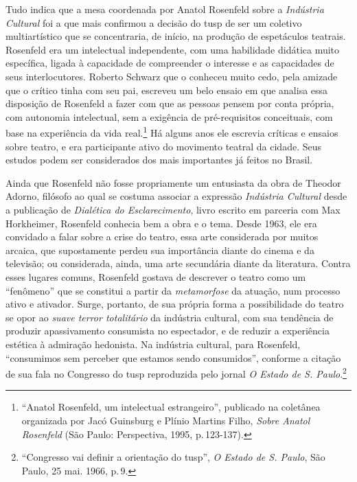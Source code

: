Tudo indica que a mesa coordenada por Anatol Rosenfeld sobre a
{\it Indústria Cultural} foi a que mais confirmou a decisão do {\sc tusp} de
ser um coletivo multiartístico que se concentraria, de início, na
produção de espetáculos teatrais. Rosenfeld era um intelectual
independente, com uma habilidade didática muito específica, ligada à
capacidade de compreender o interesse e as capacidades de seus
interlocutores. Roberto Schwarz que o conheceu muito cedo, pela amizade
que o crítico tinha com seu pai, escreveu um belo ensaio em que analisa
essa disposição de Rosenfeld a fazer com que as pessoas pensem por conta
própria, com autonomia intelectual, sem a exigência de pré-requisitos
conceituais, com base na experiência da vida real.\footnote{“Anatol
  Rosenfeld, um intelectual estrangeiro”, publicado na coletânea
  organizada por Jacó Guinsburg e Plínio Martins Filho, {\it Sobre
  Anatol Rosenfeld} (São Paulo: Perspectiva, 1995, p.\,123-137).} Há
alguns anos ele escrevia críticas e ensaios sobre teatro, e era
participante ativo do movimento teatral da cidade. Seus estudos podem
ser considerados dos mais importantes já feitos no Brasil.

Ainda que Rosenfeld não fosse propriamente um entusiasta da obra de
Theodor Adorno, filósofo ao qual se costuma associar a expressão
{\it Indústria Cultural} desde a publicação de {\it Dialética do
Esclarecimento}, livro escrito em parceria com Max Horkheimer, Rosenfeld
conhecia bem a obra e o tema. Desde 1963, ele era convidado a falar
sobre a crise do teatro, essa arte considerada por muitos arcaica, que
supostamente perdeu sua importância diante do cinema e da televisão; ou
considerada, ainda, uma arte secundária diante da literatura. Contra
esses lugares comuns, Rosenfeld gostava de descrever o teatro como um
“fenômeno” que se constitui a partir da {\it metamorfose} da atuação,
num processo ativo e ativador. Surge, portanto, de sua própria forma a
possibilidade do teatro se opor ao {\it suave terror totalitário} da
indústria cultural, com sua tendência de produzir apassivamento
consumista no espectador, e de reduzir a experiência estética à
admiração hedonista. Na indústria cultural, para Rosenfeld, “consumimos
sem perceber que estamos sendo consumidos”, conforme a citação de sua
fala no Congresso do {\sc tusp} reproduzida pelo jornal {\it O Estado de S.
Paulo}.\footnote{“Congresso vai definir a orientação do {\sc tusp}”, {\it O
  Estado de S. Paulo}, São Paulo, 25 mai. 1966, p.\,9.}

